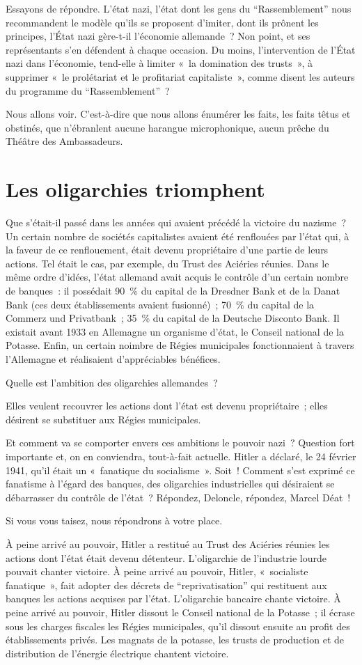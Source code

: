 \documentclass[french,twoside]{book} %
\begin{document}
Essayons de répondre. L’état nazi, l’état dont les gens du “Rassemblement” nous recommandent le modèle qu’ils se proposent d’imiter, dont ils prônent les principes, l’État nazi gère-t-il l’économie allemande ? Non point, et ses représentants s’en défendent à chaque occasion. Du moins, l’intervention de l’État nazi dans l’économie, tend-elle à limiter « la domination des trusts », à supprimer « le prolétariat et le profitariat capitaliste », comme disent les auteurs du programme du “Rassemblement” ?\par
Nous allons voir. C’est-à-dire que nous allons énumérer les faits, les faits têtus et obstinés, que n’ébranlent aucune harangue microphonique, aucun prêche du Théâtre des Ambassadeurs.
\section[{Les oligarchies triomphent}]{Les oligarchies triomphent}
\noindent Que s’était-il passé dans les années qui avaient précédé la victoire du nazisme ? Un certain nombre de sociétés capitalistes avaient été renflouées par l’état qui, à la faveur de ce renflouement, était devenu propriétaire d’une partie de leurs actions. Tel était le cas, par exemple, du Trust des Aciéries réunies. Dans le même ordre d’idées, l’état allemand avait acquis le contrôle d’un certain nombre de banques : il possédait 90 \% du capital de la Dresdner Bank et de la Danat Bank (ces deux établissements avaient fusionné) ; 70 \% du capital de la Commerz und Privatbank ; 35 \% du capital de la Deutsche Disconto Bank. Il existait avant 1933 en Allemagne un organisme d’état, le Conseil national de la Potasse. Enfin, un certain noimbre de Régies municipales fonctionnaient à travers l’Allemagne et réalisaient d’appréciables bénéfices.\par
Quelle est l’ambition des oligarchies allemandes ?\par
Elles veulent recouvrer les actions dont l’état est devenu propriétaire ; elles désirent se substituer aux Régies municipales.\par
Et comment va se comporter envers ces ambitions le pouvoir nazi ? Question fort importante et, on en conviendra, tout-à-fait actuelle. Hitler a déclaré, le 24 février 1941, qu’il était un « fanatique du socialisme ». Soit ! Comment s’est exprimé ce fanatisme à l’égard des banques, des oligarchies industrielles qui désiraient se débarrasser du contrôle de l’état ? Répondez, Deloncle, répondez, Marcel Déat !\par
Si vous vous taisez, nous répondrons à votre place.\par
À peine arrivé au pouvoir, Hitler a restitué au Trust des Aciéries réunies les actions dont l’état était devenu détenteur. L’oligarchie de l’industrie lourde pouvait chanter victoire. À peine arrivé au pouvoir, Hitler, « socialiste fanatique », fait adopter des décrets de “reprivatisation” qui restituent aux banques les actions acquises par l’état. L’oligarchie bancaire chante victoire. À peine arrivé au pouvoir, Hitler dissout le Conseil national de la Potasse ; il écrase sous les charges fiscales les Régies municipales, qu’il dissout ensuite au profit des établissements privés. Les magnats de la potasse, les trusts de production et de distribution de l’énergie électrique chantent victoire.
\end{document}
